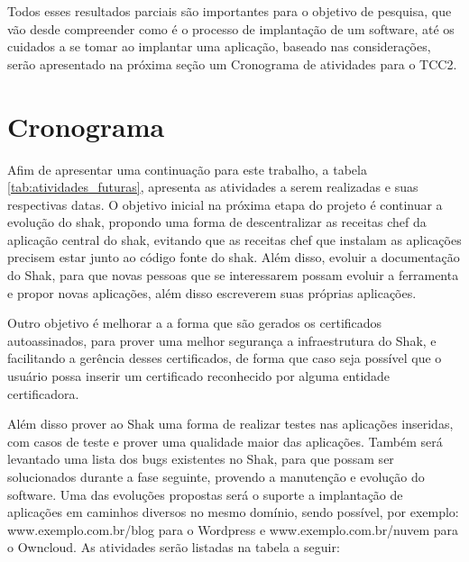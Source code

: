 Todos esses resultados parciais são importantes para o objetivo de pesquisa, que vão
desde compreender como é o processo de implantação de um software, até os cuidados
a se tomar ao implantar uma aplicação, baseado nas considerações, serão apresentado
na próxima seção um Cronograma de atividades para o TCC2.


\section{Cronograma}
%

Afim de apresentar uma continuação para este trabalho, a tabela \ref{tab:atividades_futuras},
apresenta as atividades a serem realizadas e suas respectivas datas.
O objetivo inicial na próxima etapa do projeto é continuar a evolução do shak,
propondo uma forma de descentralizar as receitas chef da aplicação central do shak,
evitando que as receitas chef que instalam as aplicações precisem estar junto ao
código fonte do shak. Além disso, evoluir a documentação do Shak, para que novas
pessoas que se interessarem possam evoluir a ferramenta e propor novas aplicações,
além disso escreverem suas próprias aplicações.

Outro objetivo é melhorar a a forma que são gerados os certificados autoassinados,
para prover uma melhor segurança a infraestrutura do Shak, e facilitando a gerência
desses certificados, de forma que caso seja possível que o usuário possa inserir um certificado
reconhecido por alguma entidade certificadora.

Além disso prover ao Shak uma forma de realizar testes nas aplicações inseridas,
com casos de teste e prover uma qualidade maior das aplicações. Também será levantado
uma lista dos bugs existentes no Shak, para que possam ser solucionados durante
a fase seguinte, provendo a manutenção e evolução do software. Uma das evoluções
propostas será o suporte a implantação de aplicações em caminhos diversos no mesmo
domínio, sendo possível, por exemplo: www.exemplo.com.br/blog para o Wordpress e
www.exemplo.com.br/nuvem para o Owncloud. As atividades serão listadas na tabela
a seguir:

